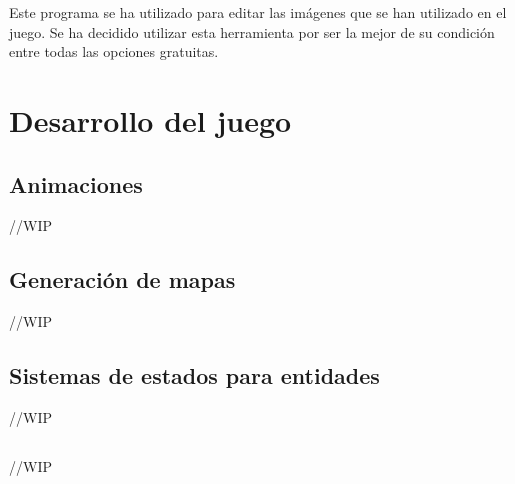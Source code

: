 		Este programa se ha utilizado para editar las imágenes que se han utilizado en el juego. Se ha decidido utilizar esta herramienta por ser la mejor de su condición entre todas las opciones gratuitas.

\section{Desarrollo del juego}

	\subsection{Animaciones}

		//WIP

	\subsection{Generación de mapas}

		//WIP

	\subsection{Sistemas de estados para entidades}

		//WIP

	\subsection{}

		//WIP
